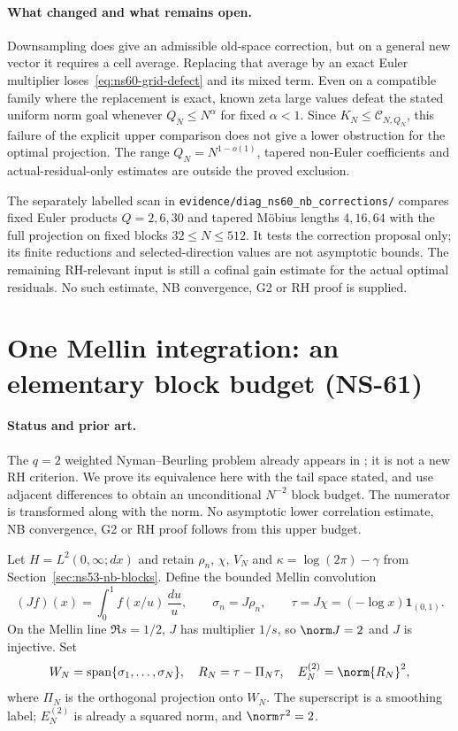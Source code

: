 \paragraph{What changed and what remains open.}
Downsampling does give an admissible old-space correction, but on a
general new vector it requires a cell average. Replacing that average
by an exact Euler multiplier loses~\eqref{eq:ns60-grid-defect} and its
mixed term. Even on a compatible family where the replacement is exact,
known zeta large values defeat the stated uniform norm goal whenever
$Q_N\leq N^\alpha$ for fixed $\alpha<1$.
Since $K_N\leq\mathcal C_{N,Q_N}$, this failure of the explicit upper
comparison does not give a lower obstruction for the optimal projection.
The range $Q_N=N^{1-o(1)}$, tapered non-Euler coefficients and
actual-residual-only estimates are outside the proved exclusion.

The separately labelled scan in
\texttt{evidence/diag\_ns60\_nb\_corrections/} compares fixed Euler
products $Q=2,6,30$ and tapered M\"obius lengths $4,16,64$ with the full
projection on fixed blocks $32\leq N\leq512$. It tests the correction
proposal only; its finite reductions and selected-direction values are
not asymptotic bounds. The remaining RH-relevant input is still a
cofinal gain estimate for the actual optimal residuals. No such estimate,
NB convergence, G2 or RH proof is supplied.

\section{One Mellin integration: an elementary block budget (NS-61)}
\label{sec:ns61-smoothed-nb}

\paragraph{Status and prior art.}
The $q=2$ weighted Nyman--Beurling problem already appears in
\cite{Ehm2024}; it is not a new RH criterion. We prove its equivalence
here with the tail space stated, and use adjacent differences to obtain
an unconditional $N^{-2}$ block budget. The numerator is transformed
along with the norm. No asymptotic lower correlation estimate, NB
convergence, G2 or RH proof follows from this upper budget.

Let $H=L^2(0,\infty;dx)$ and retain $\rho_n$, $\chi$, $V_N$ and
$\kappa=\log(2\pi)-\gamma$ from Section~\ref{sec:ns53-nb-blocks}.
Define the bounded Mellin convolution
\[
 (Jf)(x)=\int_0^1f(x/u)\,\frac{du}{u},\qquad
 \sigma_n=J\rho_n,\qquad \tau=J\chi=(-\log x)\mathbf1_{(0,1)}.
\]
On the Mellin line $\Re s=1/2$, $J$ has multiplier $1/s$, so
$\norm J=2$ and $J$ is injective. Set
\[
 W_N=\operatorname{span}\{\sigma_1,\ldots,\sigma_N\},\quad
 R_N=\tau-\Pi_N\tau,\quad E_N^{(2)}=\norm{R_N}^2,
\]
where $\Pi_N$ is the orthogonal projection onto $W_N$.
The superscript is a smoothing label; $E_N^{(2)}$ is already a
squared norm, and $\norm\tau^2=2$.

